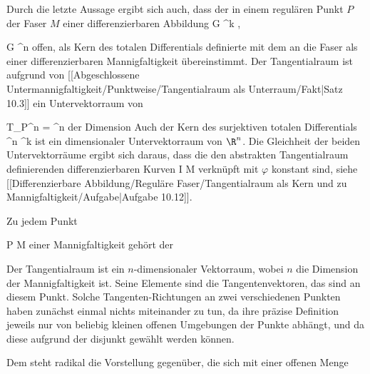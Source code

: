 Durch die letzte Aussage ergibt sich auch, dass der in einem regulären Punkt $P$ der Faser $M$ einer differenzierbaren Abbildung
\maabb {\varphi} {G} {\R^k
} {,}

\mavergleichskette
{\vergleichskette
{G
}
{ \subseteq }{ \R^n
}
{  }{
}
{    }{
}
{   }{
}
}
{}{}{}
offen, als Kern des totalen Differentials
 {} {}
definierte
mit dem
an die Faser als einer differenzierbaren Mannigfaltigkeit übereinstimmt. Der
 {} {}
Tangentialraum
 ist aufgrund von
[[Abgeschlossene Untermannigfaltigkeit/Punktweise/Tangentialraum als Unterraum/Fakt|Satz 10.3]]
ein Untervektorraum von

\mavergleichskette
{\vergleichskette
{ T_P\R^n
}
{ = }{ \R^n
}
{  }{
}
{    }{
}
{   }{
}
}
{}{}{}
der Dimension
 Auch der Kern des surjektiven totalen Differentials
 { \R^n } { \R^k
} {}
ist ein
dimensionaler Untervektorraum von $\R^n$. Die Gleichheit der beiden Untervektorräume ergibt sich daraus, dass die den abstrakten Tangentialraum definierenden differenzierbaren Kurven
\maabbdisp {\gamma} {I} {M
} {}
verknüpft mit $\varphi$ konstant sind, siehe
[[Differenzierbare Abbildung/Reguläre Faser/Tangentialraum als Kern und zu Mannigfaltigkeit/Aufgabe|Aufgabe 10.12]].


Zu jedem Punkt

\mavergleichskette
{\vergleichskette
{ P
}
{ \in }{ M
}
{  }{
}
{    }{
}
{   }{
}
}
{}{}{}
einer Mannigfaltigkeit gehört der

 Der Tangentialraum ist ein $n$-dimensionaler Vektorraum, wobei $n$ die Dimension der Mannigfaltigkeit ist. Seine Elemente sind die Tangentenvektoren, das sind  an diesem Punkt. Solche Tangen\-ten-Richtungen an zwei verschiedenen Punkten haben zunächst einmal nichts miteinander zu tun, da ihre präzise Definition jeweils nur von beliebig kleinen offenen Umgebungen der Punkte abhängt, und da diese aufgrund der
disjunkt gewählt werden können.

Dem steht radikal die Vorstellung gegenüber, die sich mit einer offenen Menge

